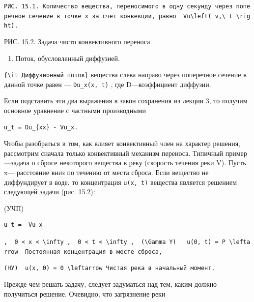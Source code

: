 \documentclass[
  ukrainian,
]{article}
\providecommand{\tightlist}{%
  \setlength{\itemsep}{0pt}\setlength{\parskip}{0pt}}
\begin{document}
\texttt{РИС.\ 15.1.\ Количество\ вещества,\ переносимого\ в\ одну\ секунду\ через\ поперечное\ сечение\ в\ точке\ x\ за\ счет\ конвекции,\ равно\ \ \textquotesingle{}Vu\textbackslash{}left(\ v,\textbackslash{}\ t\ \textbackslash{}right).\textquotesingle{}}

РИС. 15.2. Задача чисто конвективного переноса.

\begin{enumerate}
\def\labelenumi{\arabic{enumi}.}
\setcounter{enumi}{1}
\tightlist
\item
  Поток, обусловленный диффузией.
\end{enumerate}

\texttt{\{\textbackslash{}it\ Диффузионный\ поток\}} вещества слева
направо через поперечное сечение в данной точке равен ---
\texttt{Du\_x(x,\ t)} , где D---коэффициент диффузии.

Если подставить эти два выражения в закон сохранения из лекции 3, то
получим основное уравнение с частными производными

\begin{verbatim}
u_t = Du_{xx} - Vu_x.
\end{verbatim}

Чтобы разобраться в том, как влияет конвективный член на характер
решения, рассмотрим сначала только конвективный механизм переноса.
Типичный пример---задача о сбросе некоторого вещества в реку (скорость
течения реки V). Пусть x--- расстояние вниз по течению от места сброса.
Если вещество не диффундирует в воде, то концентрация \texttt{u(x,\ t)}
вещества является решением следующей задачи (рис. 15.2):

(УЧП)

\begin{verbatim}
u_t = -Vu_x
\end{verbatim}

\texttt{,\ \ \textquotesingle{}0\ \textless{}\ x\ \textless{}\ \textbackslash{}infty\textquotesingle{}\ ,\ \ \textquotesingle{}0\ \textless{}\ t\ \textless{}\ \textbackslash{}infty\textquotesingle{}\ ,\ \ \textquotesingle{}(\textbackslash{}Gamma\ Y)\textquotesingle{}\ \ \ \textquotesingle{}u(0,\ t)\ =\ P\ \textbackslash{}leftarrow\textquotesingle{}\ \ Постоянная\ концентрация\ в\ месте\ сброса,}

\texttt{(НУ)\ \ \textquotesingle{}u(x,\ 0)\ =\ 0\ \textbackslash{}leftarrow\textquotesingle{}\ Чистая\ река\ в\ начальный\ момент.}

Прежде чем решать задачу, следует задуматься над тем, каким должно
получиться решение. Очевидно, что загрязнение реки
\end{document}
